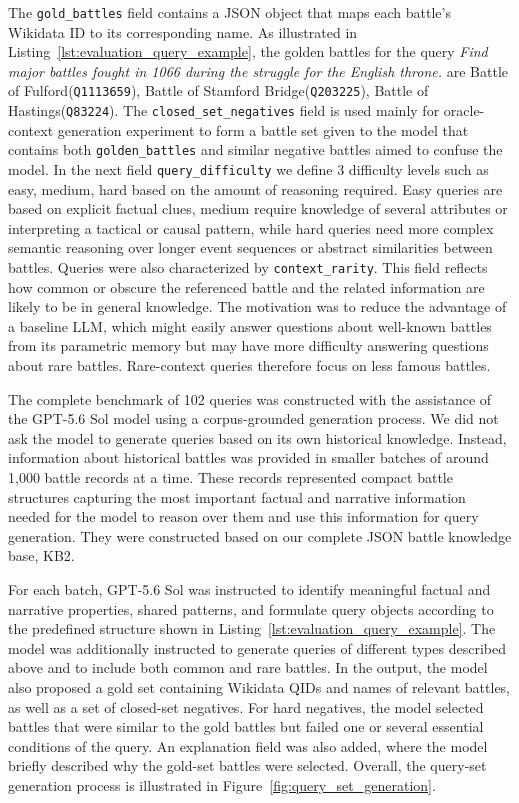 The \texttt{gold\_battles} field contains a JSON object that maps each battle's Wikidata ID to its corresponding name. As illustrated in Listing~\ref{lst:evaluation_query_example}, the golden battles for the query \textit{Find major battles fought in 1066 during the struggle for the English throne.} are Battle of Fulford(\texttt{Q1113659}), Battle of Stamford Bridge(\texttt{Q203225}), Battle of Hastings(\texttt{Q83224}). The \texttt{closed\_set\_negatives} field is used mainly for oracle-context generation experiment to form a battle set given to the model that contains both \texttt{golden\_battles} and similar negative battles aimed to confuse the model. In the next field \texttt{query\_difficulty} we define 3 difficulty levels such as easy, medium, hard based on the amount of reasoning required. Easy queries are based on explicit factual clues, medium require knowledge of several attributes or interpreting a tactical or causal pattern, while hard queries need more complex semantic reasoning over longer event sequences or abstract similarities between battles. Queries were also characterized by \texttt{context\_rarity}. This field reflects how common or obscure the referenced battle and the related information are likely to be in general knowledge. The motivation was to reduce the advantage of a baseline LLM, which might easily answer questions about well-known battles from its parametric memory but may have more difficulty answering questions about rare battles. Rare-context queries therefore focus on less famous battles.

The complete benchmark of 102 queries was constructed with the assistance of the GPT-5.6 Sol model using a corpus-grounded generation process. We did not ask the model to generate queries based on its own historical knowledge. Instead, information about historical battles was provided in smaller batches of around 1,000 battle records at a time. These records represented compact battle structures capturing the most important factual and narrative information needed for the model to reason over them and use this information for query generation. They were constructed based on our complete JSON battle knowledge base, KB2.

For each batch, GPT-5.6 Sol was instructed to identify meaningful factual and narrative properties, shared patterns, and formulate query objects according to the predefined structure shown in Listing~\ref{lst:evaluation_query_example}. The model was additionally instructed to generate queries of different types described above and to include both common and rare battles. In the output, the model also proposed a gold set containing Wikidata QIDs and names of relevant battles, as well as a set of closed-set negatives. For hard negatives, the model selected battles that were similar to the gold battles but failed one or several essential conditions of the query. An explanation field was also added, where the model briefly described why the gold-set battles were selected. Overall, the query-set generation process is illustrated in Figure~\ref{fig:query_set_generation}.

